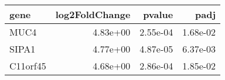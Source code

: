 \begin{tabular}{lrrr}
\toprule
    gene &  log2FoldChange &   pvalue &     padj \\
\midrule
    MUC4 &        4.83e+00 & 2.55e-04 & 1.68e-02 \\
   SIPA1 &        4.77e+00 & 4.87e-05 & 6.37e-03 \\
C11orf45 &        4.68e+00 & 2.86e-04 & 1.85e-02 \\
\bottomrule
\end{tabular}
